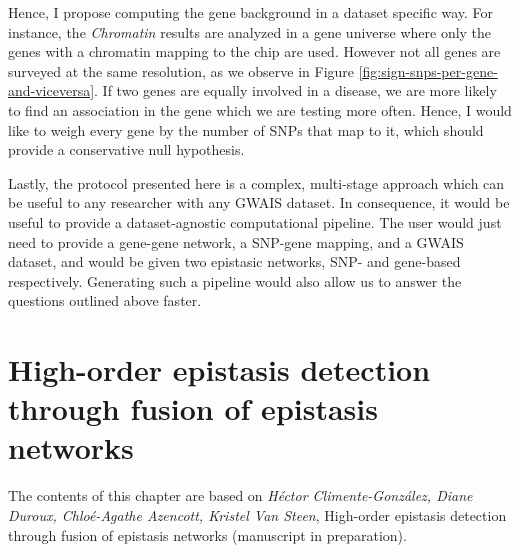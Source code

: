 \documentclass[
  11pt,
]{env/yjiao}
\begin{document}
Hence, I propose computing the gene
background in a dataset specific way. For instance, the \emph{Chromatin}
results are analyzed in a gene universe where only the genes with a chromatin
mapping to the chip are used. However not all genes are surveyed at the same
resolution, as we observe in Figure \ref{fig:sign-snps-per-gene-and-viceversa}.
If two genes are equally involved in a disease, we are more likely to find an
association in the gene which we are testing more often. Hence, I would like to
weigh every gene by the number of SNPs that map to it, which should provide
a conservative null hypothesis.

Lastly, the protocol presented here is a
complex, multi-stage approach which can be useful to any researcher with any
GWAIS dataset. In consequence, it would be useful to provide a dataset-agnostic
computational pipeline. The user would just need to provide a gene-gene network,
a SNP-gene mapping, and a GWAIS dataset, and would be given two epistasic
networks, SNP- and gene-based respectively. Generating such a pipeline would
also allow us to answer the questions outlined above faster.

\hypertarget{epi-network}{%
\chapter{High-order epistasis detection through fusion of epistasis networks}\label{epi-network}}

The contents of this chapter are based on \emph{Héctor Climente-González, Diane Duroux, Chloé-Agathe Azencott, Kristel Van Steen}, High-order epistasis detection through fusion of epistasis networks (manuscript in preparation).
\end{document}
